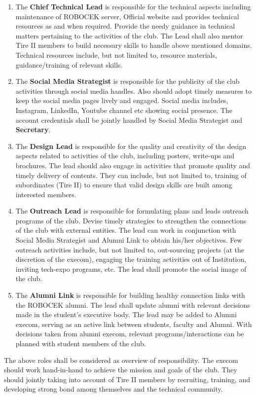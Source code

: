 \begin{enumerate}
	\item The \textbf{Chief Technical Lead} is responsible for the technical aspects including maintenance of ROBOCEK server, Official website and provides technical resources as and when required. Provide the needy guidance in technical matters pertaining to the activities of the club. The Lead shall also mentor Tire II members to build necessary skills to handle above mentioned domains. Technical resources include, but not limited to, resource materials, guidance/training of relevant skills.
	
	\item The \textbf{Social Media Strategist} is responsible for the publicity of the club activities through social media handles. Also should adopt timely measures to keep the social media pages lively and engaged. Social media includes, Instagram, LinkedIn, Youtube channel etc showing social presence. The account credentials shall be jointly handled by Social Media Strategist and \textbf{Secretary}.
	
	\item The \textbf{Design Lead} is responsible for the quality and creativity of the design aspects related to activities of the club, including posters, write-ups and brochures. The lead should also engage in activities that promote quality and timely delivery of contents. They can include, but not limited to, training of subordinates (Tire II) to ensure that valid design skills are built among interested members.
	
	\item The \textbf{Outreach Lead} is responsible for formulating plans and leads outreach programs of the club. Devise timely strategies to strengthen the connections of the club with external entities. The lead can work in conjunction with Social Media Strategist and Alumni Link to obtain his/her objectives. Few outreach activities include, but not limited to, out-sourcing projects (at the discretion of the execom), engaging the training activities out of Institution, inviting tech-expo programs, etc. The lead shall promote the social image of the club.
	
	\item The \textbf{Alumni Link} is responsible for building healthy connection links with the ROBOCEK alumni. The lead shall update alumni with relevant decisions made in the student's executive body. The lead may be added to Alumni execom, serving as an active link between students, faculty and Alumni. With decisions taken from alumni execom, relevant programs/interactions can be planned with student members of the club.
	
\end{enumerate}
The above roles shall be considered as overview of responsibility. The execom should work hand-in-hand to achieve the mission and goals of the club. They should jointly taking into account of Tire II members by recruiting, training, and developing strong bond among themselves and the technical community.   

